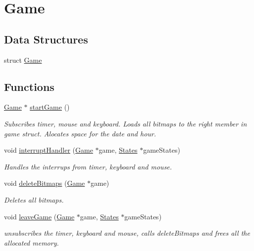 \hypertarget{group___game}{}\section{Game}
\label{group___game}
\subsection*{Data Structures}
\begin{DoxyCompactItemize}
\item 
struct \hyperlink{struct_game}{Game}
\end{DoxyCompactItemize}
\subsection*{Functions}
\begin{DoxyCompactItemize}
\item 
\hyperlink{struct_game}{Game} $\ast$ \hyperlink{group___game_gadf0b0e23d862996b1c252ab29227ffb1}{start\+Game} ()
\begin{DoxyCompactList}\small\item\em Subscribes timer, mouse and keyboard. Loads all bitmaps to the right member in game struct. Alocates space for the date and hour. \end{DoxyCompactList}\item 
void \hyperlink{group___game_ga5f4dcc9f4534fe0b6c73f105705434f8}{interrupt\+Handler} (\hyperlink{struct_game}{Game} $\ast$game, \hyperlink{struct_states}{States} $\ast$game\+States)
\begin{DoxyCompactList}\small\item\em Handles the interrups from timer, keyboard and mouse. \end{DoxyCompactList}\item 
void \hyperlink{group___game_gac69172228ce6b7881580536187b0ce82}{delete\+Bitmaps} (\hyperlink{struct_game}{Game} $\ast$game)
\begin{DoxyCompactList}\small\item\em Deletes all bitmaps. \end{DoxyCompactList}\item 
void \hyperlink{group___game_ga6fcaca11a4e0464324d12d8995454396}{leave\+Game} (\hyperlink{struct_game}{Game} $\ast$game, \hyperlink{struct_states}{States} $\ast$game\+States)
\begin{DoxyCompactList}\small\item\em unsubscribes the timer, keyboard and mouse, calls delete\+Bitmaps and frees all the allocated memory. \end{DoxyCompactList}\end{DoxyCompactItemize}


